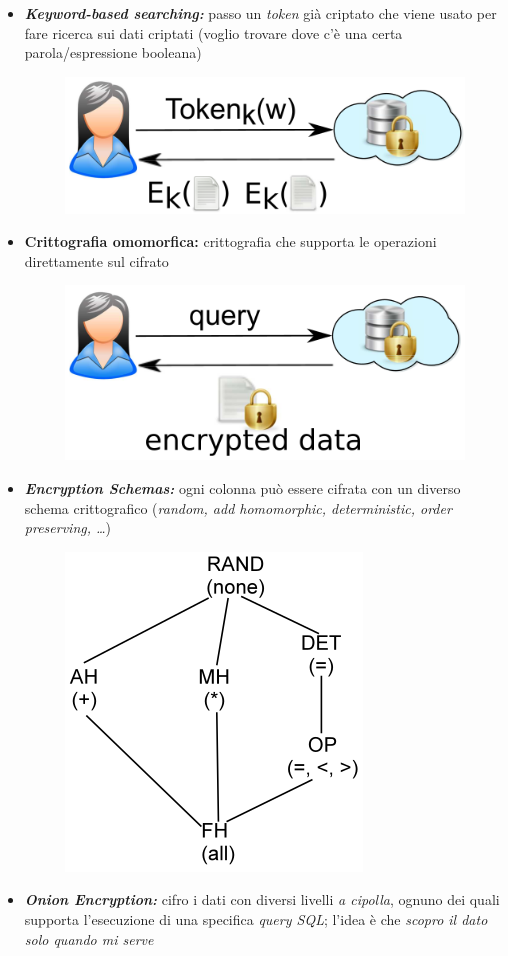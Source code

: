 \documentclass{report}
\begin{document}
\begin{itemize}
    \item \textbf{\textit{Keyword-based searching:}} passo un \textit{token} già criptato 
    che viene usato per fare ricerca sui dati criptati (voglio trovare dove c'è una certa parola/espressione booleana)
    \begin{figure}[ht]
        \centering
        \includegraphics[width=0.4\linewidth]{images/encryption/token-based-search.png}
    \end{figure}
    \item \textbf{Crittografia omomorfica:} crittografia che supporta le operazioni direttamente sul cifrato
    \begin{figure}[ht]
        \centering
        \includegraphics[width=0.4\linewidth]{images/encryption/homomorphic.png}
    \end{figure}
    \item \textbf{\textit{Encryption Schemas:}} ogni colonna può essere cifrata con un diverso schema crittografico 
    (\textit{random, add homomorphic, deterministic, order preserving, \dots})
    \begin{figure}[ht]
        \centering
        \includegraphics[width=0.3\linewidth]{images/encryption/schemas.png}
    \end{figure}
    \item \textbf{\textit{Onion Encryption:}} cifro i dati con diversi livelli \textit{a cipolla}, ognuno dei quali
    supporta l'esecuzione di una specifica \textit{query SQL}; l'idea è che \textit{scopro il dato solo quando mi serve}
    \begin{figure}[ht]

\end{figure}
\end{itemize}
\end{document}

